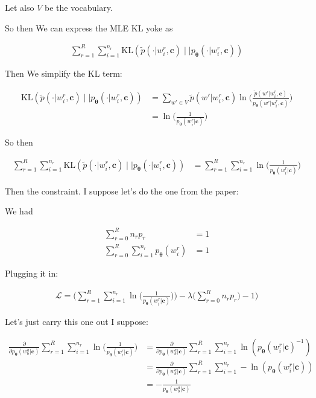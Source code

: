 \documentclass{article}
\newcommand{\KL}{\mathrm{KL}}
\newcommand{\vtheta}{\boldsymbol{\theta}}
\newcommand{\model}{p_{\vtheta}}
\newcommand{\context}{\boldsymbol{c}}
\begin{document}
			Let also $V$ be the vocabulary.
			
			So then We can express the MLE KL yoke as
			
			\begin{align}
				\sum^R_{r=1} \sum^{n_r}_{i=1} \KL( \tilde{p}(\cdot|w^r_i,\context)\mid\mid \model(\cdot | w^r_i,\context))
			\end{align}
			
			Then We simplify the KL term:
			
			\begin{align}
			\KL( \tilde{p}(\cdot|w^r_i,\context)\mid\mid \model(\cdot | w^r_i,\context)) &= \sum_{w'\in V} \tilde{p}( w' |w^r_i,\context) \ln\bigg(\frac{\tilde{p}( w' |w^r_i,\context)}{\model( w' |w^r_i,\context)} \bigg)\\
			&= \ln\bigg(\frac{1}{\model(w^r_i|\context)} \bigg)
			\end{align}
			
			So then 
		
			\begin{align}
				\sum^R_{r=1} \sum^{n_r}_{i=1} \KL( \tilde{p}(\cdot|w^r_i,\context)\mid\mid \model(\cdot | w^r_i,\context)) &= \sum^R_{r=1} \sum^{n_r}_{i=1} \ln\bigg(\frac{1}{\model(w^r_i|\context)} \bigg)
			\end{align}
		
			Then the constraint. I suppose let's do the one from the paper:
			
			We had
			
			\begin{align}
				\sum^R_{r=0} n_r p_r &= 1\\
				\sum^R_{r=0} \sum^{n_r}_{i=1} \model(w^r_i) &= 1
			\end{align}
			
			Plugging it in:
			
			\begin{align}
				\mathcal{L} = \bigg(\sum^R_{r=1} \sum^{n_r}_{i=1} \ln\bigg(\frac{1}{\model(w^r_i|\context)} \bigg)\bigg) - \lambda\bigg(\sum^R_{r=0}n_r p_r\bigg) -1\bigg)
			\end{align}
			
			Let's just carry this one out I suppose:
			
			\begin{align}
				\frac{\partial }{\partial \model(w^a_b|\context)} \sum^R_{r=1} \sum^{n_r}_{i=1} \ln\bigg(\frac{1}{\model(w^r_i|\context)} \bigg) &= \frac{\partial }{\partial \model(w^a_b|\context)} \sum^R_{r=1} \sum^{n_r}_{i=1} \ln(\model(w^r_i|\context)^{-1} )\\
				&= \frac{\partial }{\partial \model(w^a_b|\context)} \sum^R_{r=1} \sum^{n_r}_{i=1} -\ln(\model(w^r_i|\context) )\\
				&= -\frac{1}{\model(w^a_b|\context)}
			\end{align}
					
\end{document}
